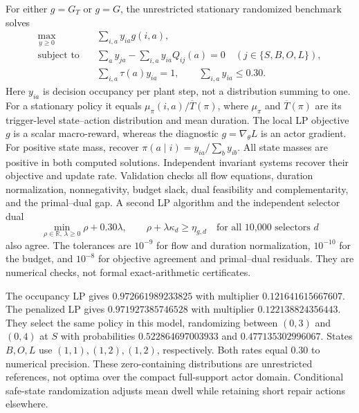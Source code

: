\documentclass[11pt]{article}
\newcommand{\1}{\mathbf{1}}
\newcommand{\Tbar}{\overline{T}}
\begin{document}
For either $g=G_T$ or $g=G$, the unrestricted stationary randomized benchmark solves
\[
 \begin{aligned}
 \max_{y\ge0}\quad &\sum_{i,a}y_{ia}g(i,a),\\
 \text{subject to}\quad
 &\sum_a y_{ja}-\sum_{i,a}y_{ia}Q_{ij}(a)=0\quad(j\in\{S,B,O,L\}),\\
 &\sum_{i,a}\tau(a)y_{ia}=1,\qquad \sum_{i,a}y_{ia}\le0.30.
 \end{aligned}
\]
Here $y_{ia}$ is decision occupancy per plant step, not a distribution summing to one. For a stationary policy it equals $\mu_\pi(i,a)/\Tbar(\pi)$, where $\mu_\pi$ and $\Tbar(\pi)$ are its trigger-level state--action distribution and mean duration. The local LP objective $g$ is a scalar macro-reward, whereas the diagnostic $g=\nabla_\theta L$ is an actor gradient. For positive state mass, recover $\pi(a\mid i)=y_{ia}/\sum_b y_{ib}$. All state masses are positive in both computed solutions. Independent invariant systems recover their objective and update rate. Validation checks all flow equations, duration normalization, nonnegativity, budget slack, dual feasibility and complementarity, and the primal--dual gap. A second LP algorithm and the independent selector dual
\[
 \min_{\rho\in\mathbb R,\,\lambda\ge0}\rho+0.30\lambda,
 \qquad \rho+\lambda\kappa_d\ge\eta_{g,d}\quad\text{for all 10,000 selectors }d
\]
also agree. The tolerances are $10^{-9}$ for flow and duration normalization, $10^{-10}$ for the budget, and $10^{-8}$ for objective agreement and primal--dual residuals. They are numerical checks, not formal exact-arithmetic certificates.

The occupancy LP gives $0.972661989233825$ with multiplier $0.121641615667607$. The penalized LP gives $0.971927385746528$ with multiplier $0.122138824356443$. They select the same policy in this model, randomizing between $(0,3)$ and $(0,4)$ at $S$ with probabilities $0.522864697003933$ and $0.477135302996067$. States $B,O,L$ use $(1,1),(1,2),(1,2)$, respectively. Both rates equal $0.30$ to numerical precision. These zero-containing distributions are unrestricted references, not optima over the compact full-support actor domain. Conditional safe-state randomization adjusts mean dwell while retaining short repair actions elsewhere.
\end{document}
